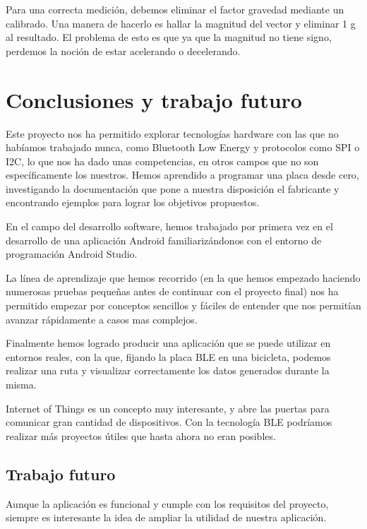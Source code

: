 Para una correcta medición, debemos eliminar el factor gravedad mediante un calibrado. Una manera de hacerlo es hallar la magnitud del vector y eliminar 1 g al resultado. El problema de esto es que ya que la magnitud no tiene signo, perdemos la noción de estar acelerando o decelerando.

\cleardoublepage

\chapter{Conclusiones y trabajo futuro}
\label{makereference8}

Este proyecto nos ha permitido explorar tecnologías hardware con las que no habíamos trabajado nunca, como Bluetooth Low Energy y protocolos como SPI o I2C, lo que nos ha dado unas competencias, en otros campos que no son específicamente los nuestros. Hemos aprendido a programar una placa desde cero, investigando la documentación que pone a nuestra disposición el fabricante y encontrando ejemplos para lograr los objetivos propuestos.

En el campo del desarrollo software, hemos trabajado por primera vez en el desarrollo de una aplicación Android familiarizándonos con el entorno de programación Android Studio.

La línea de aprendizaje que hemos recorrido (en la que hemos empezado haciendo numerosas pruebas pequeñas antes de continuar con el proyecto final) nos ha permitido empezar por conceptos sencillos y fáciles de entender que nos permitían avanzar rápidamente a casos mas complejos.

Finalmente hemos logrado producir una aplicación que se puede utilizar en entornos reales, con la que, fijando la placa BLE en una bicicleta, podemos realizar una ruta y visualizar correctamente los datos generados durante la misma.

Internet of Things es un concepto muy interesante, y abre las puertas para comunicar gran cantidad de dispositivos. Con la tecnología BLE podríamos realizar más proyectos útiles que hasta ahora no eran posibles.

\section{Trabajo futuro}

Aunque la aplicación es funcional y cumple con los requisitos del proyecto, siempre es interesante la idea de ampliar la utilidad de nuestra aplicación.

